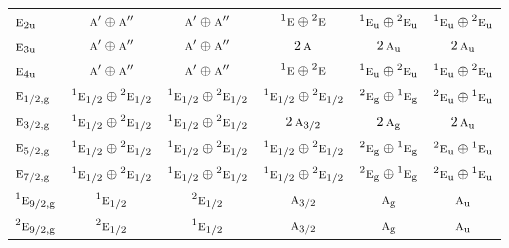 \documentclass[10pt,a4paper]{article}
\numberwithin{equation}{section}
\newcommand{\irr}[1]{\text{\normalfont\scshape #1}}
\newcommand{\conjpair}[1]{{}^{#1}}
\newcommand{\ptag}[1]{\mathrm{#1}}
\begin{document}
{\begin{longtable}{@{}lccccc@{}}
$\irr{e}_{2\ptag{u}}$ & $\irr{a}'\oplus \irr{a}''$ & $\irr{a}'\oplus \irr{a}''$ & $\conjpair{1}\irr{e}\oplus \conjpair{2}\irr{e}$ & $\conjpair{1}\irr{e}_{\ptag{u}}\oplus \conjpair{2}\irr{e}_{\ptag{u}}$ & $\conjpair{1}\irr{e}_{\ptag{u}}\oplus \conjpair{2}\irr{e}_{\ptag{u}}$\\
$\irr{e}_{3\ptag{u}}$ & $\irr{a}'\oplus \irr{a}''$ & $\irr{a}'\oplus \irr{a}''$ & $2\,\irr{a}$ & $2\,\irr{a}_{\ptag{u}}$ & $2\,\irr{a}_{\ptag{u}}$\\
$\irr{e}_{4\ptag{u}}$ & $\irr{a}'\oplus \irr{a}''$ & $\irr{a}'\oplus \irr{a}''$ & $\conjpair{1}\irr{e}\oplus \conjpair{2}\irr{e}$ & $\conjpair{1}\irr{e}_{\ptag{u}}\oplus \conjpair{2}\irr{e}_{\ptag{u}}$ & $\conjpair{1}\irr{e}_{\ptag{u}}\oplus \conjpair{2}\irr{e}_{\ptag{u}}$\\
$\irr{e}_{1/2,\ptag{g}}$ & $\conjpair{1}\irr{e}_{1/2}\oplus \conjpair{2}\irr{e}_{1/2}$ & $\conjpair{1}\irr{e}_{1/2}\oplus \conjpair{2}\irr{e}_{1/2}$ & $\conjpair{1}\irr{e}_{1/2}\oplus \conjpair{2}\irr{e}_{1/2}$ & $\conjpair{2}\irr{e}_{\ptag{g}}\oplus \conjpair{1}\irr{e}_{\ptag{g}}$ & $\conjpair{2}\irr{e}_{\ptag{u}}\oplus \conjpair{1}\irr{e}_{\ptag{u}}$\\
$\irr{e}_{3/2,\ptag{g}}$ & $\conjpair{1}\irr{e}_{1/2}\oplus \conjpair{2}\irr{e}_{1/2}$ & $\conjpair{1}\irr{e}_{1/2}\oplus \conjpair{2}\irr{e}_{1/2}$ & $2\,\irr{a}_{3/2}$ & $2\,\irr{a}_{\ptag{g}}$ & $2\,\irr{a}_{\ptag{u}}$\\
$\irr{e}_{5/2,\ptag{g}}$ & $\conjpair{1}\irr{e}_{1/2}\oplus \conjpair{2}\irr{e}_{1/2}$ & $\conjpair{1}\irr{e}_{1/2}\oplus \conjpair{2}\irr{e}_{1/2}$ & $\conjpair{1}\irr{e}_{1/2}\oplus \conjpair{2}\irr{e}_{1/2}$ & $\conjpair{2}\irr{e}_{\ptag{g}}\oplus \conjpair{1}\irr{e}_{\ptag{g}}$ & $\conjpair{2}\irr{e}_{\ptag{u}}\oplus \conjpair{1}\irr{e}_{\ptag{u}}$\\
$\irr{e}_{7/2,\ptag{g}}$ & $\conjpair{1}\irr{e}_{1/2}\oplus \conjpair{2}\irr{e}_{1/2}$ & $\conjpair{1}\irr{e}_{1/2}\oplus \conjpair{2}\irr{e}_{1/2}$ & $\conjpair{1}\irr{e}_{1/2}\oplus \conjpair{2}\irr{e}_{1/2}$ & $\conjpair{2}\irr{e}_{\ptag{g}}\oplus \conjpair{1}\irr{e}_{\ptag{g}}$ & $\conjpair{2}\irr{e}_{\ptag{u}}\oplus \conjpair{1}\irr{e}_{\ptag{u}}$\\
$\conjpair{1}\irr{e}_{9/2,\ptag{g}}$ & $\conjpair{1}\irr{e}_{1/2}$ & $\conjpair{2}\irr{e}_{1/2}$ & $\irr{a}_{3/2}$ & $\irr{a}_{\ptag{g}}$ & $\irr{a}_{\ptag{u}}$\\
$\conjpair{2}\irr{e}_{9/2,\ptag{g}}$ & $\conjpair{2}\irr{e}_{1/2}$ & $\conjpair{1}\irr{e}_{1/2}$ & $\irr{a}_{3/2}$ & $\irr{a}_{\ptag{g}}$ & $\irr{a}_{\ptag{u}}$\\

\end{longtable}}
\end{document}
